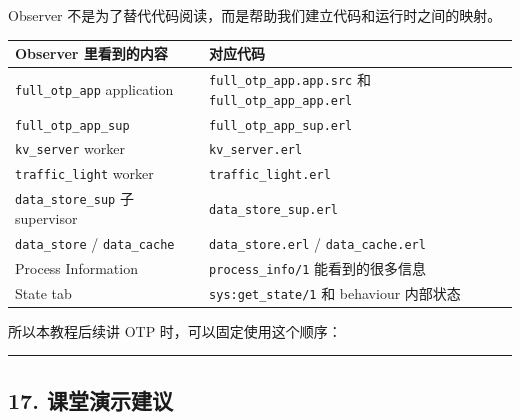 Observer 不是为了替代代码阅读，而是帮助我们建立代码和运行时之间的映射。

\begin{longtable}[]{@{}
  >{\raggedright\arraybackslash}p{}
  >{\raggedright\arraybackslash}p{}@{}}
\toprule\noalign{}
\begin{minipage}[b]{\linewidth}\raggedright
Observer 里看到的内容
\end{minipage} & \begin{minipage}[b]{\linewidth}\raggedright
对应代码
\end{minipage} \\
\midrule\noalign{}
\endhead
\bottomrule\noalign{}
\endlastfoot
\texttt{full\_otp\_app} application & \texttt{full\_otp\_app.app.src} 和
\texttt{full\_otp\_app\_app.erl} \\
\texttt{full\_otp\_app\_sup} & \texttt{full\_otp\_app\_sup.erl} \\
\texttt{kv\_server} worker & \texttt{kv\_server.erl} \\
\texttt{traffic\_light} worker & \texttt{traffic\_light.erl} \\
\texttt{data\_store\_sup} 子 supervisor &
\texttt{data\_store\_sup.erl} \\
\texttt{data\_store} / \texttt{data\_cache} & \texttt{data\_store.erl} /
\texttt{data\_cache.erl} \\
Process Information & \texttt{process\_info/1} 能看到的很多信息 \\
State tab & \texttt{sys:get\_state/1} 和 behaviour 内部状态 \\
\end{longtable}

所以本教程后续讲 OTP 时，可以固定使用这个顺序：

\begin{Shaded}
\begin{Highlighting}[]
\end{Highlighting}
\end{Shaded}

\begin{center}\rule{0.5\linewidth}{0.5pt}\end{center}

\subsection{17.
课堂演示建议}\label{ux8bfeux5802ux6f14ux793aux5efaux8bae}

